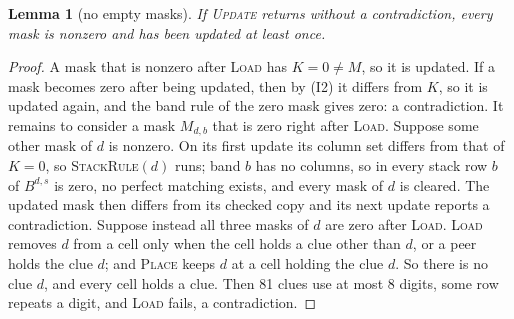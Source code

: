 \documentclass[11pt]{article}
\newtheorem{lemma}[theorem]{Lemma}
\theoremstyle{definition}
\theoremstyle{plain}
\let\origtextsc\textsc
\renewcommand{\textsc}[1]{\textup{\origtextsc{#1}}}
\begin{document}
\begin{lemma}[no empty masks]
\label{lem:nonzero}
If \textsc{Update} returns without a contradiction, every mask is nonzero and has been updated at least once.
\end{lemma}
\begin{proof}
A mask that is nonzero after \textsc{Load} has $K=0\neq M$, so it is updated. If a mask becomes zero after being
updated, then by (I2) it differs from $K$, so it is updated again, and the band rule of the zero mask gives zero: a
contradiction. It remains to consider a mask $M_{d,b}$ that is zero right after \textsc{Load}. Suppose some other mask
of $d$ is nonzero. On its first update its column set differs from that of $K=0$, so \textsc{StackRule}$(d)$ runs; band
$b$ has no columns, so in every stack row $b$ of $B^{d,s}$ is zero, no perfect matching exists, and every mask of $d$
is cleared. The updated mask then differs from its checked copy and its next update reports a contradiction. Suppose
instead all three masks of $d$ are zero after \textsc{Load}. \textsc{Load} removes $d$ from a cell only when the cell
holds a clue other than $d$, or a peer holds the clue $d$; and \textsc{Place} keeps $d$ at a cell holding the clue $d$.
So there is no clue $d$, and every cell holds a clue. Then 81 clues use at most 8 digits, some row repeats a digit, and
\textsc{Load} fails, a contradiction.
\end{proof}
\end{document}
